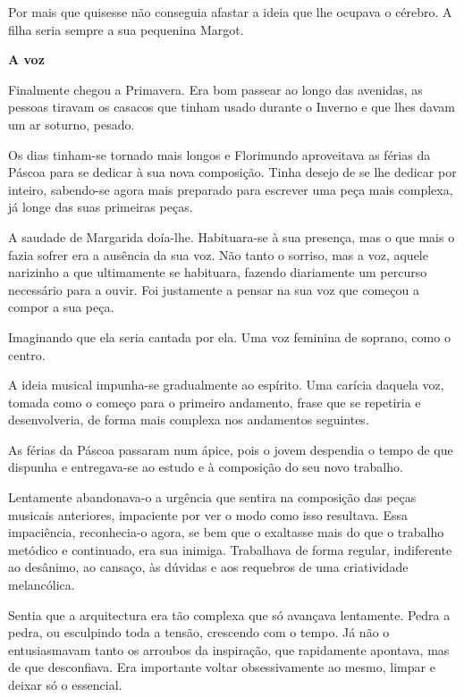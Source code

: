 Por mais que quisesse não conseguia afastar a ideia que lhe ocupava o
cérebro. A filha seria sempre a sua pequenina Margot.

\vspace*{1.8cm}
\noindent{}\textbf{A voz}

\bigskip

Finalmente chegou a Primavera. Era bom passear ao longo das avenidas, as
pessoas tiravam os casacos que tinham usado durante o Inverno e que lhes
davam um ar soturno, pesado.

Os dias tinham-se tornado mais longos e Florimundo aproveitava as férias
da Páscoa para se dedicar à sua nova composição. Tinha desejo de se lhe
dedicar por inteiro, sabendo-se agora mais preparado para escrever uma
peça mais complexa, já longe das suas primeiras peças.

A saudade de Margarida doía-lhe. Habituara-se à sua presença, mas o que
mais o fazia sofrer era a ausência da sua voz. Não tanto o sorriso, mas
a voz, aquele narizinho a que ultimamente se habituara, fazendo
diariamente um percurso necessário para a ouvir. Foi justamente a pensar
na sua voz que começou a compor a sua peça.

Imaginando que ela seria cantada por ela. Uma voz feminina de soprano,
como o centro.

A ideia musical impunha-se gradualmente ao espírito. Uma carícia daquela
voz, tomada como o começo para o primeiro andamento, frase que se
repetiria e desenvolveria, de forma mais complexa nos andamentos
seguintes.

As férias da Páscoa passaram num ápice, pois o jovem despendia o tempo
de que dispunha e entregava-se ao estudo e à composição do seu novo
trabalho.

Lentamente abandonava-o a urgência que sentira na composição das peças
musicais anteriores, impaciente por ver o modo como isso resultava. Essa
impaciência, reconhecia-o agora, se bem que o exaltasse mais do que o
trabalho metódico e continuado, era sua inimiga. Trabalhava de forma
regular, indiferente ao desânimo, ao cansaço, às dúvidas e aos requebros
de uma criatividade melancólica.

Sentia que a arquitectura era tão complexa que só avançava lentamente.
Pedra a pedra, ou esculpindo toda a tensão, crescendo com o tempo. Já
não o entusiasmavam tanto os arroubos da inspiração, que rapidamente
apontava, mas de que desconfiava. Era importante voltar obsessivamente
ao mesmo, limpar e deixar só o essencial.

